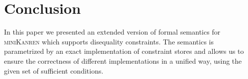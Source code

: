 \section{Conclusion}

In this paper we presented an extended version of formal semantics for \textsc{miniKanren} which supports disequality constraints.
The semantics is parametrized by an exact implementation of constraint stores and allows us to ensure the correctness of different implementations
in a unified way, using the given set of sufficient conditions.
